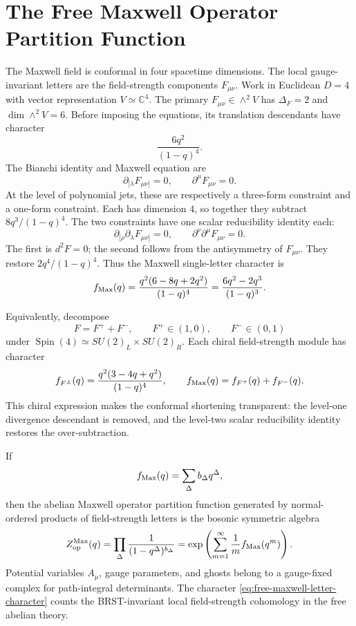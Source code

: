 \section{The Free Maxwell Operator Partition Function}
\label{sec:free-maxwell-cylinder-partition}

The Maxwell field is conformal in four spacetime dimensions.  The local
gauge-invariant letters are the field-strength components \(F_{\mu\nu}\).
Work in Euclidean \(D=4\) with vector representation
\(V\simeq\mathbb C^4\).  The primary \(F_{\mu\nu}\in\wedge^2V\) has
\(\Delta_F=2\) and \(\dim\wedge^2V=6\).  Before imposing the equations, its
translation descendants have character
\[
  \frac{6q^2}{(1-q)^4}.
\]
The Bianchi identity and Maxwell equation are
\begin{equation}
  \partial_{[\lambda}F_{\mu\nu]}=0,
  \qquad
  \partial^\mu F_{\mu\nu}=0.
  \label{eq:maxwell-bianchi-eom-letter}
\end{equation}
At the level of polynomial jets, these are respectively a three-form
constraint and a one-form constraint.  Each has dimension \(4\), so together
they subtract \(8q^3/(1-q)^4\).  The two constraints have one scalar
reducibility identity each:
\[
  \partial_{[\rho}\partial_\lambda F_{\mu\nu]}=0,
  \qquad
  \partial^\nu\partial^\mu F_{\mu\nu}=0.
\]
The first is \(d^2F=0\); the second follows from the antisymmetry of
\(F_{\mu\nu}\).  They restore \(2q^4/(1-q)^4\).  Thus the Maxwell
single-letter character is
\begin{equation}
  f_{\rm Max}(q)
  =
  \frac{q^2(6-8q+2q^2)}{(1-q)^4}
  =
  \frac{6q^2-2q^3}{(1-q)^3}.
  \label{eq:free-maxwell-letter-character}
\end{equation}

Equivalently, decompose
\[
  F=F^++F^-,
  \qquad
  F^+\in(1,0),
  \qquad
  F^-\in(0,1)
\]
under \(\operatorname{Spin}(4)\simeq SU(2)_L\times SU(2)_R\).  Each chiral field-strength
module has character
\[
  f_{F^\pm}(q)
  =
  \frac{q^2(3-4q+q^2)}{(1-q)^4},
  \qquad
  f_{\rm Max}(q)=f_{F^+}(q)+f_{F^-}(q).
\]
This chiral expression makes the conformal shortening transparent: the
level-one divergence descendant is removed, and the level-two scalar
reducibility identity restores the over-subtraction.

If
\[
  f_{\rm Max}(q)=\sum_\Delta b_\Delta q^\Delta,
\]
then the abelian Maxwell operator partition function generated by
normal-ordered products of field-strength letters is the bosonic symmetric
algebra
\begin{equation}
  Z_{\rm op}^{\rm Max}(q)
  =
  \prod_\Delta\frac1{(1-q^\Delta)^{b_\Delta}}
  =
  \exp\left(
    \sum_{m=1}^{\infty}\frac1m f_{\rm Max}(q^m)
  \right).
  \label{eq:free-maxwell-operator-partition}
\end{equation}
Potential variables \(A_\mu\), gauge parameters, and ghosts belong to a
gauge-fixed complex for path-integral determinants.  The character
\eqref{eq:free-maxwell-letter-character} counts the BRST-invariant local
field-strength cohomology in the free abelian theory.

